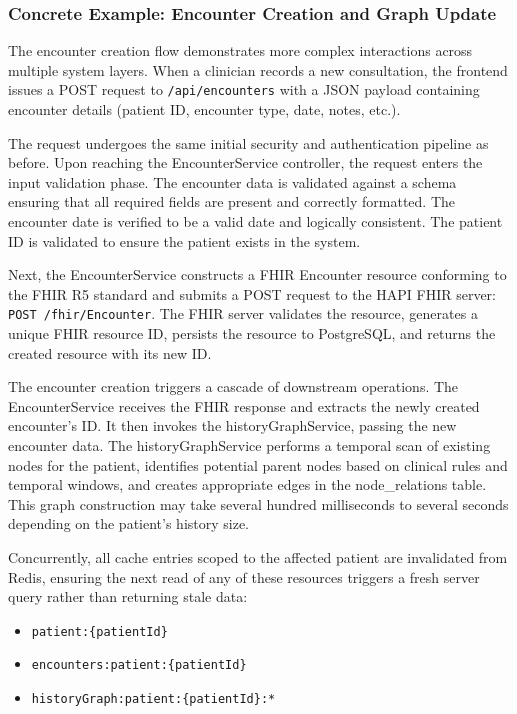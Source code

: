 \subsubsection{Concrete Example: Encounter Creation and Graph Update}
The encounter creation flow demonstrates more complex interactions across
multiple system layers. When a clinician records a new consultation, the
frontend issues a POST request to \texttt{/api/encounters} with a JSON payload
containing encounter details (patient ID, encounter type, date, notes, etc.).

The request undergoes the same initial security and authentication pipeline as
before. Upon reaching the EncounterService controller, the request enters the
input validation phase. The encounter data is validated against a schema
ensuring that all required fields are present and correctly formatted. The
encounter date is verified to be a valid date and logically consistent. The
patient ID is validated to ensure the patient exists in the system.

Next, the EncounterService constructs a FHIR Encounter resource conforming to
the FHIR R5 standard and submits a POST request to the HAPI FHIR server:
\texttt{POST /fhir/Encounter}. The FHIR server validates the resource,
generates a unique FHIR resource ID, persists the resource to PostgreSQL, and
returns the created resource with its new ID.

The encounter creation triggers a cascade of downstream operations. The
EncounterService receives the FHIR response and extracts the newly created
encounter's ID. It then invokes the historyGraphService, passing the new
encounter data. The historyGraphService performs a temporal scan of existing
nodes for the patient, identifies potential parent nodes based on clinical
rules and temporal windows, and creates appropriate edges in the
node\_relations table. This graph construction may take several hundred
milliseconds to several seconds depending on the patient's history size.

Concurrently, all cache entries scoped to the affected patient are invalidated
from Redis, ensuring the next read of any of these resources triggers a fresh
server query rather than returning stale data:
\begin{itemize}
  \item \texttt{patient:\{patientId\}}
  \item \texttt{encounters:patient:\{patientId\}}
  \item \texttt{historyGraph:patient:\{patientId\}:*}
\end{itemize}

